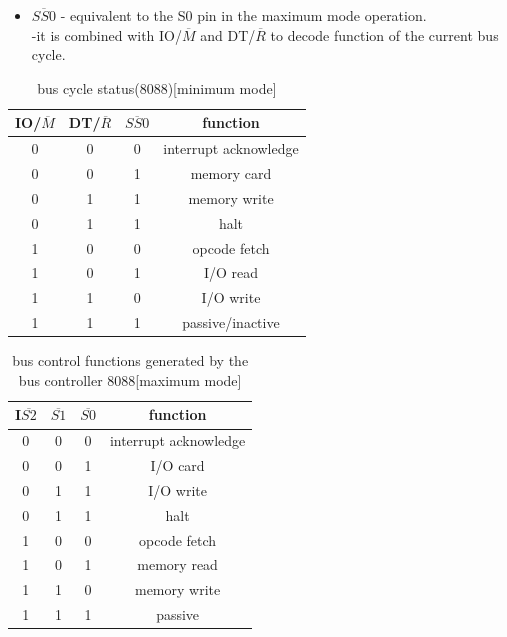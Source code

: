 \documentclass[12pt]{article}
\begin{document}
\begin{itemize}
\begin{itemize}
		\item\textbf{$\overline{SS0}$} - equivalent to the S0 pin in the maximum mode operation.\\
		-it is combined with IO/$\overline{M}$ and DT/$\overline{R}$ to decode function of the current bus cycle.
		  
	\end{itemize}  

	\begin{table}[H]
		\centering
		\begin{tabular}{|c|c|c|c|}
			\hline
			IO/$\overline{M}$ & DT/$\overline{R}$ & $\overline{SS0}$ & \textbf{function}\\\hline
			
			0 & 0 & 0 & interrupt acknowledge\\\hline
			0 & 0 & 1 & memory card\\\hline
			0 & 1 & 1 & memory write\\\hline
			0 & 1 & 1 & halt\\\hline
			1 & 0 & 0 & opcode fetch\\\hline
			1 & 0 & 1 & I/O read\\\hline
			1 & 1 & 0 & I/O write\\\hline
			1 & 1 & 1 & passive/inactive\\\hline
		\end{tabular}
		\caption{bus cycle status(8088)[minimum mode]}
	\end{table}

		\begin{table}[H]
		\centering
		\begin{tabular}{|c|c|c|c|}
			\hline
			I$\overline{S2}$ & $\overline{S1}$ & $\overline{S0}$ & \textbf{function}\\\hline
			
			0 & 0 & 0 & interrupt acknowledge\\\hline
			0 & 0 & 1 & I/O card\\\hline
			0 & 1 & 1 & I/O write\\\hline
			0 & 1 & 1 & halt\\\hline
			1 & 0 & 0 & opcode fetch\\\hline
			1 & 0 & 1 & memory read\\\hline
			1 & 1 & 0 & memory write\\\hline
			1 & 1 & 1 & passive\\\hline
		\end{tabular}
		\caption{bus control functions generated by the bus controller 8088[maximum mode]}
	\end{table}
\end{itemize}
\end{document}

